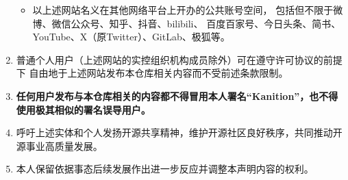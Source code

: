 \begin{enumerate}
\begin{itemize}
\begin{itemize}
                        \end{itemize}
                  \item 以上述网站名义在其他网络平台上开办的公共账号空间，
                        包括但不限于微博、微信公众号、知乎、抖音、bilibili、
                        百度百家号、今日头条、简书、YouTube、X（原Twitter）、GitLab、极狐等。
            \end{itemize}
      \item 普通个人用户（上述网站的实控组织机构成员除外）可在遵守许可协议的前提下
            自由地于上述网站发布本仓库相关内容而不受前述条款限制。
      \item {\bfseries 任何用户发布与本仓库相关的内容都不得冒用本人署名“Kanition”，也不得使用极其相似的署名误导用户。}
      \item 呼吁上述实体和个人发扬开源共享精神，维护开源社区良好秩序，共同推动开源事业高质量发展。
      \item 本人保留依据事态后续发展作出进一步反应并调整本声明内容的权利。
\end{enumerate}
